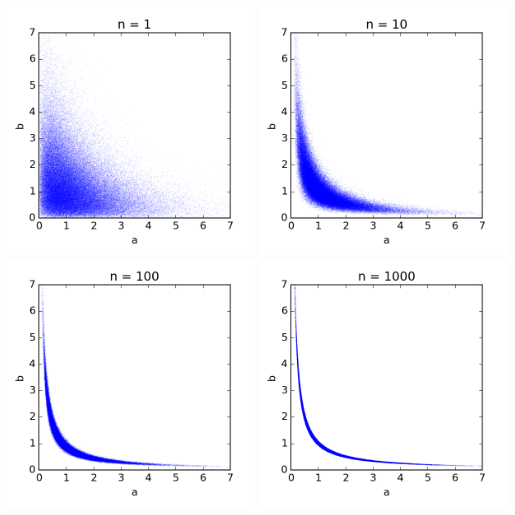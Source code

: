 \documentclass[12pt]{article}
\begin{document}
\begin{center}
\includegraphics[trim=0 0 0 0, clip, width=0.49\textwidth]{code/ex2-n=1.png}
\includegraphics[trim=0 0 0 0, clip, width=0.49\textwidth]{code/ex2-n=10.png}\\
\includegraphics[trim=0 0 0 0, clip, width=0.49\textwidth]{code/ex2-n=100.png}
\includegraphics[trim=0 0 0 0, clip, width=0.49\textwidth]{code/ex2-n=1000.png}
\end{center}
\end{document}
